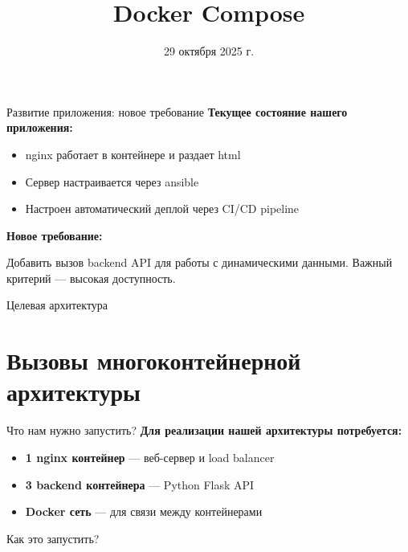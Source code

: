 \documentclass[aspectratio=169]{beamer}
\title{Docker Compose}
\date{29 октября 2025 г.}
\begin{document}
\maketitle

\begin{frame}{Развитие приложения: новое требование}
\textbf{Текущее состояние нашего приложения:}

\begin{itemize}
\item nginx работает в контейнере и раздает html
\item Сервер настраивается через ansible
\item Настроен автоматический деплой через CI/CD pipeline
\end{itemize}

\vspace{0.3cm}

\textbf{Новое требование:}

Добавить вызов backend API для работы с динамическими данными. Важный критерий — высокая доступность.
\end{frame}

\begin{frame}{Целевая архитектура}
%
%
\begin{figure}
\centering

\label{fig:lb-schema}
\end{figure}
\end{frame}

\section{Вызовы многоконтейнерной архитектуры}

\begin{frame}{Что нам нужно запустить?}
\textbf{Для реализации нашей архитектуры потребуется:}

\begin{itemize}
\item \textbf{1 nginx контейнер} — веб-сервер и load balancer
\item \textbf{3 backend контейнера} — Python Flask API
\item \textbf{Docker сеть} — для связи между контейнерами
\end{itemize}

\vspace{0.3cm}

Как это запустить?
\end{frame}
\end{document}

